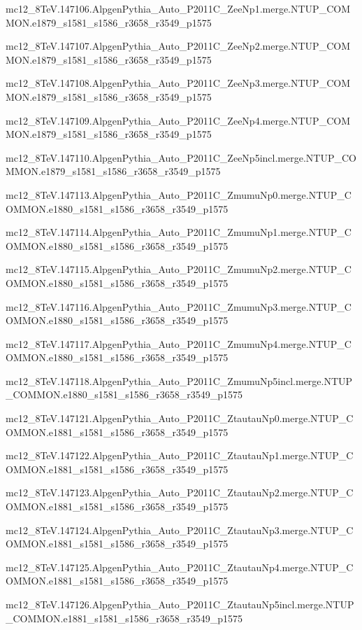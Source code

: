 mc12\_8TeV.147106.AlpgenPythia\_Auto\_P2011C\_ZeeNp1.merge.NTUP\_COMMON.e1879\_s1581\_s1586\_r3658\_r3549\_p1575

mc12\_8TeV.147107.AlpgenPythia\_Auto\_P2011C\_ZeeNp2.merge.NTUP\_COMMON.e1879\_s1581\_s1586\_r3658\_r3549\_p1575

mc12\_8TeV.147108.AlpgenPythia\_Auto\_P2011C\_ZeeNp3.merge.NTUP\_COMMON.e1879\_s1581\_s1586\_r3658\_r3549\_p1575

mc12\_8TeV.147109.AlpgenPythia\_Auto\_P2011C\_ZeeNp4.merge.NTUP\_COMMON.e1879\_s1581\_s1586\_r3658\_r3549\_p1575

mc12\_8TeV.147110.AlpgenPythia\_Auto\_P2011C\_ZeeNp5incl.merge.NTUP\_COMMON.e1879\_s1581\_s1586\_r3658\_r3549\_p1575

mc12\_8TeV.147113.AlpgenPythia\_Auto\_P2011C\_ZmumuNp0.merge.NTUP\_COMMON.e1880\_s1581\_s1586\_r3658\_r3549\_p1575

mc12\_8TeV.147114.AlpgenPythia\_Auto\_P2011C\_ZmumuNp1.merge.NTUP\_COMMON.e1880\_s1581\_s1586\_r3658\_r3549\_p1575

mc12\_8TeV.147115.AlpgenPythia\_Auto\_P2011C\_ZmumuNp2.merge.NTUP\_COMMON.e1880\_s1581\_s1586\_r3658\_r3549\_p1575

mc12\_8TeV.147116.AlpgenPythia\_Auto\_P2011C\_ZmumuNp3.merge.NTUP\_COMMON.e1880\_s1581\_s1586\_r3658\_r3549\_p1575

mc12\_8TeV.147117.AlpgenPythia\_Auto\_P2011C\_ZmumuNp4.merge.NTUP\_COMMON.e1880\_s1581\_s1586\_r3658\_r3549\_p1575

mc12\_8TeV.147118.AlpgenPythia\_Auto\_P2011C\_ZmumuNp5incl.merge.NTUP\_COMMON.e1880\_s1581\_s1586\_r3658\_r3549\_p1575

mc12\_8TeV.147121.AlpgenPythia\_Auto\_P2011C\_ZtautauNp0.merge.NTUP\_COMMON.e1881\_s1581\_s1586\_r3658\_r3549\_p1575

mc12\_8TeV.147122.AlpgenPythia\_Auto\_P2011C\_ZtautauNp1.merge.NTUP\_COMMON.e1881\_s1581\_s1586\_r3658\_r3549\_p1575

mc12\_8TeV.147123.AlpgenPythia\_Auto\_P2011C\_ZtautauNp2.merge.NTUP\_COMMON.e1881\_s1581\_s1586\_r3658\_r3549\_p1575

mc12\_8TeV.147124.AlpgenPythia\_Auto\_P2011C\_ZtautauNp3.merge.NTUP\_COMMON.e1881\_s1581\_s1586\_r3658\_r3549\_p1575

mc12\_8TeV.147125.AlpgenPythia\_Auto\_P2011C\_ZtautauNp4.merge.NTUP\_COMMON.e1881\_s1581\_s1586\_r3658\_r3549\_p1575

mc12\_8TeV.147126.AlpgenPythia\_Auto\_P2011C\_ZtautauNp5incl.merge.NTUP\_COMMON.e1881\_s1581\_s1586\_r3658\_r3549\_p1575



